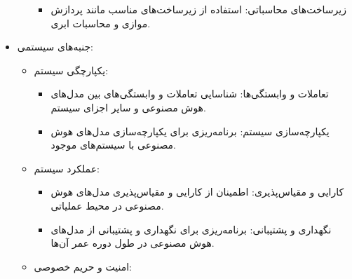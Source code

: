 \documentclass[a4paper,10pt]{article}
\begin{document}
\begin{itemize}
\begin{itemize}
\begin{itemize}
                            \item زیرساخت‌های محاسباتی: استفاده از زیرساخت‌های مناسب مانند پردازش موازی و محاسبات ابری.

                        \end{itemize}

                    \end{itemize}

                    \item جنبه‌های سیستمی:

                    \begin{itemize}

                        \item یکپارچگی سیستم:
                        
                        \begin{itemize}
                            
                            \item تعاملات و وابستگی‌ها: شناسایی تعاملات و وابستگی‌های بین مدل‌های هوش مصنوعی و سایر اجزای سیستم.

                            \item یکپارچه‌سازی سیستم: برنامه‌ریزی برای یکپارچه‌سازی مدل‌های هوش مصنوعی با سیستم‌های موجود.

                        \end{itemize}

                        \item عملکرد سیستم:

                        \begin{itemize}
                            
                            \item کارایی و مقیاس‌پذیری: اطمینان از کارایی و مقیاس‌پذیری مدل‌های هوش مصنوعی در محیط عملیاتی.

                            \item نگهداری و پشتیبانی: برنامه‌ریزی برای نگهداری و پشتیبانی از مدل‌های هوش مصنوعی در طول دوره عمر آن‌ها.

                        \end{itemize}

                        \item امنیت و حریم خصوصی:

                        \begin{itemize}
                            

\end{itemize}
\end{itemize}
\end{itemize}
\end{document}
